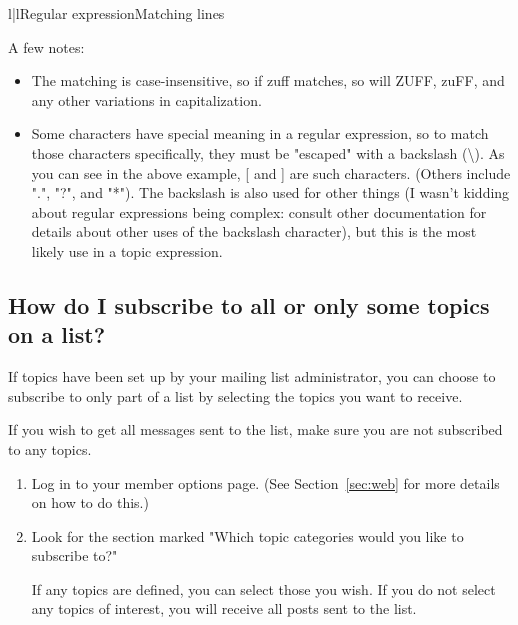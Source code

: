\documentclass{howto}
\begin{document}
\begin{tableii}{l|l}{}{Regular expression}{Matching lines}
\hline
\end{tableii}

A few notes:
\begin{itemize}
	\item The matching is case-insensitive, so if zuff matches, so will ZUFF,
	 zuFF, and any other variations in capitalization.
	\item Some characters have special meaning in a regular expression, so
	to match those characters specifically, they must be "escaped" with a 
	backslash (\textbackslash).  As you can see in the above example, 
	[ and ] are such characters.  (Others include ".", "?", and "*").  
	The backslash is also used for other things (I wasn't kidding about 
	regular expressions being complex: consult other documentation
	for details about other uses of the backslash character), but this 
	is the most likely use in a topic expression.
\end{itemize}

\subsection{How do I subscribe to all or only some topics on a 
	list?\label{sec:sometopic}}

If topics have been set up by your mailing list administrator, you can 
choose to subscribe to only part of a list by selecting the topics you
want to receive.

If you wish to get all messages sent to the list, make sure you 
are not subscribed to any topics.

\begin{enumerate}
	\item Log in to your member options page.  (See Section~\ref{sec:web} 
	for more details on how to do this.)
	\item Look for the section marked "Which topic categories would you like 
	to subscribe to?" 

	If any topics are defined, you can select those you wish.  If you do
	not select any topics of interest, you will receive all posts 
	sent to the list.
\end{enumerate}
\end{document}
